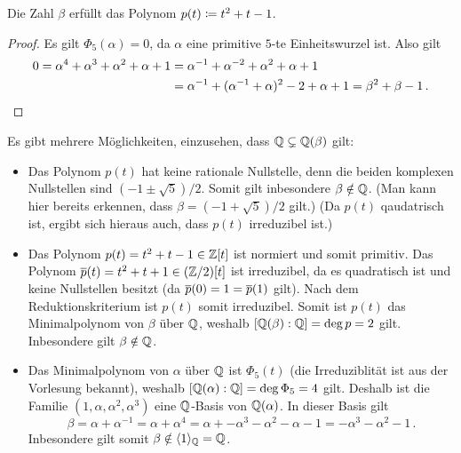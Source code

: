 \begin{claim*}
  Die Zahl $\beta$ erfüllt das Polynom $p(t) \coloneqq t^2 + t - 1$.
\end{claim*}

\begin{proof}
  Es gilt $\Phi_5(\alpha) = 0$, da $\alpha$ eine primitive $5$-te Einheitswurzel ist.
  Also gilt
  \begin{align*}
        0
     =  \alpha^4 + \alpha^3 + \alpha^2 + \alpha + 1
    &=  \alpha^{-1} + \alpha^{-2} + \alpha^2 + \alpha + 1
    \\
    &=  \alpha^{-1} + (\alpha^{-1} + \alpha)^2 - 2 + \alpha + 1
     =  \beta^2 + \beta - 1 \,.
  \qedhere
  \end{align*}
\end{proof}

Es gibt mehrere Möglichkeiten, einzusehen, dass $\mathbb{Q} \subsetneq \mathbb{Q}(\beta)$ gilt:

\begin{itemize}
  \item
    Das Polynom $p(t)$ hat keine rationale Nullstelle, denn die beiden komplexen Nullstellen sind $(-1 \pm \sqrt{5})/2$.
    Somit gilt inbesondere $\beta \notin \mathbb{Q}$.
    (Man kann hier bereits erkennen, dass $\beta = (-1 + \sqrt{5})/2$ gilt.)
    (Da $p(t)$ qaudatrisch ist, ergibt sich hieraus auch, dass $p(t)$ irreduzibel ist.)
  \item
    Das Polynom $p(t) = t^2 + t -1 \in \mathbb{Z}[t]$ ist normiert und somit primitiv.
    Das Polynom $\overline{p}(t) = t^2 + t + 1 \in (\mathbb{Z}/2)[t]$ ist irreduzibel, da es quadratisch ist und keine Nullstellen besitzt (da $\overline{p}(0) = 1 = \overline{p}(1)$ gilt).
    Nach dem Reduktionskriterium ist $p(t)$ somit irreduzibel.
    Somit ist $p(t)$ das Minimalpolynom von $\beta$ über $\mathbb{Q}$, weshalb $[\mathbb{Q}(\beta) : \mathbb{Q}] = \deg p = 2$ gilt.
    Inbesondere gilt $\beta \notin \mathbb{Q}$.
  \item
    Das Minimalpolynom von $\alpha$ über $\mathbb{Q}$ ist $\Phi_5(t)$ (die Irreduziblität ist aus der Vorlesung bekannt), weshalb $[\mathbb{Q}(\alpha) : \mathbb{Q}] = \deg \Phi_5 = 4$ gilt.
    Deshalb ist die Familie $(1, \alpha, \alpha^2, \alpha^3)$ eine $\mathbb{Q}$-Basis von $\mathbb{Q}(\alpha)$.
    In dieser Basis gilt
    \[
        \beta
      = \alpha + \alpha^{-1}
      = \alpha + \alpha^4
      = \alpha + -\alpha^3 - \alpha^2 - \alpha - 1
      = -\alpha^3 - \alpha^2 - 1 \,.
    \]
    Inbesondere gilt somit $\beta \notin \langle 1 \rangle_{\mathbb{Q}} = \mathbb{Q}$.
\end{itemize}

